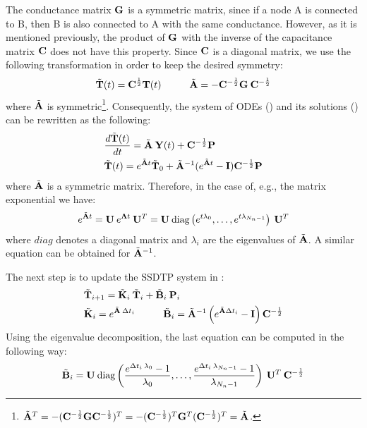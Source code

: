 The conductance matrix $\mathbf{G}$ is a symmetric matrix, since if a node A is
connected to B, then B is also connected to A with the same conductance.
However, as it is mentioned previously, the product of $\mathbf{G}$ with the inverse
of the capacitance matrix $\mathbf{C}$ does not have this property. Since $\mathbf{C}$ is
a diagonal matrix, we use the following transformation in order to keep the
desired symmetry:
\begin{equation} \elab{substitution}
  \tilde{\v{T}}(t) = \m{C}^{\frac{1}{2}} \v{T}(t) \hspace{10mm} \tilde{\m{A}} = -\m{C}^{-\frac{1}{2}} \m{G} \: \m{C}^{-\frac{1}{2}}
\end{equation}
where $\tilde{\mathbf{A}}$ is symmetric\footnote{$\tilde{\mathbf{A}}^T = -(\mathbf{C}^{-\frac{1}{2}} \mathbf{G}
\mathbf{C}^{-\frac{1}{2}})^T = -(\mathbf{C}^{-\frac{1}{2}})^T \mathbf{G}^T
(\mathbf{C}^{-\frac{1}{2}})^T = \tilde{\mathbf{A}}$.}. Consequently, the system of ODEs
() and its solutions () can be rewritten as
the following:
\begin{align*}
  & \frac{d\tilde{\mathbf{T}}(t)}{dt} = \tilde{\mathbf{A}} \: \mathbf{Y}(t) + \mathbf{C}^{-\frac{1}{2}} \mathbf{P} \\
  & \tilde{\mathbf{T}}(t) = e^{\tilde{\mathbf{A}} t} \tilde{\mathbf{T}}_0 + \tilde{\mathbf{A}}^{-1} (e^{\tilde{\mathbf{A}} t} - \mathbf{I}) \mathbf{C}^{-\frac{1}{2}} \mathbf{P}
\end{align*}
where $\tilde{\mathbf{A}}$ is a symmetric matrix. Therefore, in the case of, e.g.,
the matrix exponential we have:
\begin{equation} \elab{matrix-exponential}
  e^{\tm{A} t} = \m{U} \: e^{\m{\Lambda} t} \: \m{U}^T = \m{U} \: \diag{e^{t \lambda_0}}{e^{t \lambda_{N_n - 1}}} \: \m{U}^T
\end{equation}
where $diag$ denotes a diagonal matrix and $\lambda_i$ are the eigenvalues of
$\tilde{\mathbf{A}}$. A similar equation can be obtained for $\tilde{\mathbf{A}}^{-1}$.

The next step is to update the SSDTP system in :
\begin{align}
  & \tv{T}_{i+1} = \tm{K}_i \: \tv{T}_i + \tm{B}_i \: \v{P}_i \elab{recurrent-equation} \\
  & \tm{K}_i = e^{\tm{A} \: \Delta t_i} \hspace{10mm} \tm{B}_i = \tm{A}^{-1} \left( e^{\tm{A} \Delta t_i} - \m{I} \right) \m{C}^{-\frac{1}{2}} \nonumber
\end{align}
Using the eigenvalue decomposition, the last equation can be computed in the
following way:
\[
  \tilde{\mathbf{B}}_i = \mathbf{U} \: \text{diag} \left( \frac{e^{\Delta t_i \: \lambda_0} - 1}{\lambda_0}, \dots, \frac{e^{\Delta t_i \: \lambda_{N_n - 1}} - 1}{\lambda_{N_n - 1}} \right) \: \mathbf{U}^T \: \mathbf{C}^{-\frac{1}{2}}
\]


